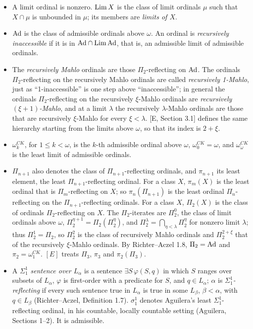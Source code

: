 \documentclass[11pt]{article}
\begin{document}
\begin{itemize}
\item A limit ordinal is nonzero. $\mathrm{Lim}\, X$ is the class of limit ordinals $\mu$ such that $X \cap \mu$ is unbounded in
  $\mu$; its members are \emph{limits of $X$}.
\item $\mathrm{Ad}$ is the class of admissible ordinals above $\omega$. An ordinal is \emph{recursively inaccessible} if it is
  in $\mathrm{Ad} \cap \mathrm{Lim}\, \mathrm{Ad}$, that is, an admissible limit of admissible ordinals.
\item The \emph{recursively Mahlo} ordinals are those $\Pi_2$-reflecting on $\mathrm{Ad}$. The ordinals
  $\Pi_2$-reflecting on the recursively Mahlo ordinals are called \emph{recursively 1-Mahlo}, just as
  ``1-inaccessible'' is one step above ``inaccessible''; in general the ordinals $\Pi_2$-reflecting on the recursively
  $\xi$-Mahlo ordinals are \emph{recursively $(\xi+1)$-Mahlo}, and at a limit $\lambda$ the recursively
  $\lambda$-Mahlo ordinals are those that are recursively $\xi$-Mahlo for every $\xi < \lambda$. [E, Section 3.1]
  defines the same hierarchy starting from the limits above $\omega$, so that its index is $2+\xi$.
\item $\omega_k^{CK}$, for $1 \le k < \omega$, is the $k$-th admissible ordinal above $\omega$, $\omega_0^{CK} =
  \omega$, and $\omega_\omega^{CK}$ is the least limit of admissible ordinals.
\item $\Pi_{n+1}$ also denotes the class of $\Pi_{n+1}$-reflecting ordinals, and $\pi_{n+1}$ its least element, the
  least $\Pi_{n+1}$-reflecting ordinal. For a class $X$, $\pi_m(X)$ is the least ordinal that is $\Pi_m$-reflecting on
  $X$; so $\pi_n(\Pi_{n+1})$ is the least ordinal $\Pi_n$-reflecting on the $\Pi_{n+1}$-reflecting ordinals. For a class $X$, $\Pi_2(X)$ is the class of ordinals $\Pi_2$-reflecting on $X$. The
  $\Pi_2$-iterates are $\Pi_2^0$, the class of limit ordinals above $\omega$, $\Pi_2^{\eta+1} = \Pi_2(\Pi_2^\eta)$,
  and $\Pi_2^\lambda = \bigcap_{\eta<\lambda} \Pi_2^\eta$ for nonzero limit $\lambda$; thus $\Pi_2^1 = \Pi_2$, so $\Pi_2^2$ is the class of recursively Mahlo
  ordinals and $\Pi_2^{2+\xi}$ that of the recursively $\xi$-Mahlo ordinals. By
  Richter--Aczel 1.8, $\Pi_2 = \mathrm{Ad}$ and $\pi_2 = \omega_1^{CK}$. $[E]$ treats $\Pi_3$, $\pi_3$ and $\pi_2(\Pi_3)$.
\item A \emph{$\Sigma^1_1$ sentence over $L_\alpha$} is a sentence $\exists S\, \varphi(S, q)$ in which $S$ ranges over
  subsets of $L_\alpha$, $\varphi$ is first-order with a predicate for $S$, and $q \in L_\alpha$; $\alpha$ is
  \emph{$\Sigma^1_1$-reflecting} if every such sentence true in $L_\alpha$ is true in some $L_\beta$, $\beta < \alpha$,
  with $q \in L_\beta$ (Richter--Aczel, Definition 1.7). $\sigma^1_1$ denotes Aguilera's least $\Sigma^1_1$-reflecting
  ordinal, in his countable, locally countable setting (Aguilera, Sections 1--2). It is admissible.
\end{itemize}
\end{document}
